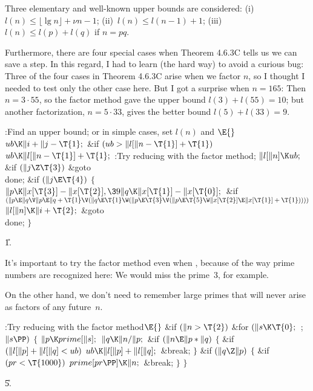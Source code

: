 Three elementary and well-known upper bounds are considered:
(i)~$l(n)\le\lfloor\lg n\rfloor+\nu n-1$;
(ii)~$l(n)\le l(n-1)+1$;
(iii)~$l(n)\le l(p)+l(q)$ if $n=pq$.

Furthermore, there are four special cases
when Theorem 4.6.3C tells us we can save a step.
In this regard, I had to learn (the hard way) to avoid a
curious bug: Three of the four cases in Theorem 4.6.3C arise
when we factor $n$, so I thought I needed to test only the
other case here. But I got a surprise when $n=165$: Then
$n=3\cdot55$, so the factor method gave the upper bound
$l(3)+l(55)=10$; but another factorization, $n=5\cdot33$,
gives the better bound $l(5)+l(33)=9$.

\Y\B\4:Find an upper bound; or in simple cases, set $l(n)$ and \X${}\E{}$\6
$\\{ub}\K\|i+\|j-\T{1};{}$\6
\&{if} ${}(\\{ub}>\|l[\|n-\T{1}]+\T{1}){}$\1\5
${}\\{ub}\K\|l[\|n-\T{1}]+\T{1};{}$\2\6
:Try reducing  with the factor method\X;\6
${}\|l[\|n]\K\\{ub};{}$\6
\&{if} ${}(\|j\Z\T{3}){}$\1\5
\&{goto} \\{done};\2\6
\&{if} ${}(\|j\E\T{4}){}$\5
${}\{{}$\1\6
${}\|p\K\|x[\T{3}]-\|x[\T{2}],\39\|q\K\|x[\T{1}]-\|x[\T{0}];{}$\6
\&{if} ${}(\|p\E\|q\V\|p\E\|q+\T{1}\V(\|q\E\T{1}\W(\|p\E\T{3}\V(\|p\E\T{5}\W%
\|x[\T{2}]\E\|x[\T{1}]+\T{1})))){}$\1\5
${}\|l[\|n]\K\|i+\T{2};{}$\2\6
\&{goto} \\{done};\6
\4${}\}{}$\2\par
\U1.\fi

It's important to try the factor method even when ,
because
of the way prime numbers are recognized here: We would miss the
prime~3, for example.

On the other hand, we don't need to remember large primes that will
never arise as factors of any future~$n$.

\Y\B\4:Try reducing  with the factor method\X${}\E{}$\6
\&{if} ${}(\|n>\T{2}){}$\1\6
\&{for} ${}(\|s\K\T{0};{}$  ; ${}\|s\PP){}$\5
${}\{{}$\1\6
${}\|p\K\\{prime}[\|s];{}$\6
${}\|q\K\|n/\|p;{}$\6
\&{if} ${}(\|n\E\|p*\|q){}$\5
${}\{{}$\1\6
\&{if} ${}(\|l[\|p]+\|l[\|q]<\\{ub}){}$\1\5
${}\\{ub}\K\|l[\|p]+\|l[\|q];{}$\2\6
\&{break};\6
\4${}\}{}$\2\6
\&{if} ${}(\|q\Z\|p){}$\5
${}\{{}$\1\6
\&{if} ${}(\\{pr}<\T{1000}){}$\1\5
${}\\{prime}[\\{pr}\PP]\K\|n;{}$\2\6
\&{break};\6
\4${}\}{}$\2\6
\4${}\}{}$\2\2\par
\U5.\fi

